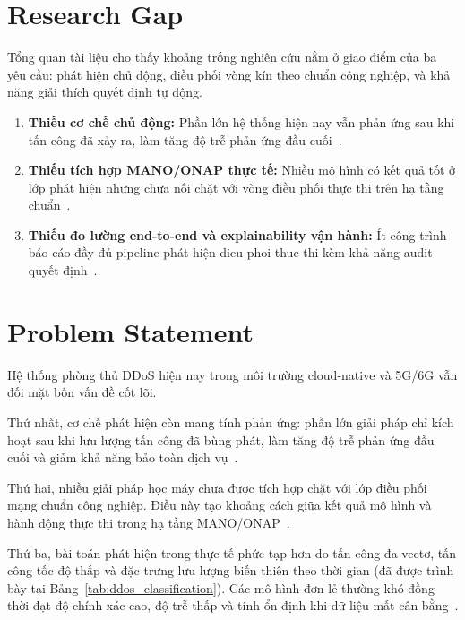 \section{Research Gap}
\label{sec:research_gap}

Tổng quan tài liệu cho thấy khoảng trống nghiên cứu nằm ở giao điểm của ba yêu cầu: phát hiện chủ động, điều phối vòng kín theo chuẩn công nghiệp, và khả năng giải thích quyết định tự động.

\begin{enumerate}
  \item \textbf{Thiếu cơ chế chủ động:} Phần lớn hệ thống hiện nay vẫn phản ứng sau khi tấn công đã xảy ra, làm tăng độ trễ phản ứng đầu-cuối~\cite{mirkovic2004taxonomy}.
  \item \textbf{Thiếu tích hợp MANO/ONAP thực tế:} Nhiều mô hình có kết quả tốt ở lớp phát hiện nhưng chưa nối chặt với vòng điều phối thực thi trên hạ tầng chuẩn~\cite{etsi_nfv_arch,onap_arch}.
  \item \textbf{Thiếu đo lường end-to-end và explainability vận hành:} Ít công trình báo cáo đầy đủ pipeline phát hiện-dieu phoi-thuc thi kèm khả năng audit quyết định~\cite{benlloch2026}.
\end{enumerate}

\section{Problem Statement}
\label{sec:problem_statement}

Hệ thống phòng thủ DDoS hiện nay trong môi trường cloud-native và 5G/6G vẫn đối mặt bốn vấn đề cốt lõi.

Thứ nhất, cơ chế phát hiện còn mang tính phản ứng: phần lớn giải pháp chỉ kích hoạt sau khi lưu lượng tấn công đã bùng phát, làm tăng độ trễ phản ứng đầu cuối và giảm khả năng bảo toàn dịch vụ~\cite{jcc2026proactive}.

Thứ hai, nhiều giải pháp học máy chưa được tích hợp chặt với lớp điều phối mạng chuẩn công nghiệp. Điều này tạo khoảng cách giữa kết quả mô hình và hành động thực thi trong hạ tầng MANO/ONAP~\cite{etsi_nfv_arch,onap_arch}.

Thứ ba, bài toán phát hiện trong thực tế phức tạp hơn do tấn công đa vectơ, tấn công tốc độ thấp và đặc trưng lưu lượng biến thiên theo thời gian (đã được trình bày tại Bảng~\ref{tab:ddos_classification}). Các mô hình đơn lẻ thường khó đồng thời đạt độ chính xác cao, độ trễ thấp và tính ổn định khi dữ liệu mất cân bằng~\cite{mdpi2025transformer}.

